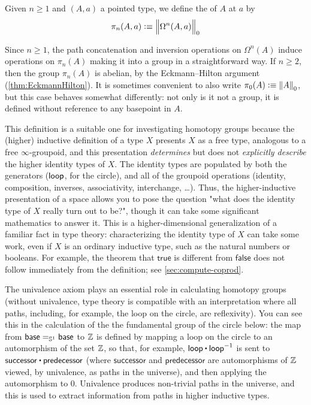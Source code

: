 \begin{defn}\label{def-of-homotopy-groups}
  Given $n\ge 1$ and $(A,a)$ a pointed type, we define the  of $A$
  at $a$ by
  \[\pi_n(A,a)\defeq \Trunc0{\Omega^n(A,a)}\]
\end{defn}

\noindent
Since $n\ge 1$, the path concatenation and inversion operations on
$\Omega^n(A)$ induce operations on $\pi_n(A)$ making it into a group in
a straightforward way.  If $n\ge 2$, then the group $\pi_n(A)$ is
abelian, by the Eckmann--Hilton argument (\autoref{thm:EckmannHilton}).
It is sometimes convenient to also write $\pi_0(A) \defeq \trunc0 A$,
but this case behaves somewhat differently: not only is it not a group,
it is defined without reference to any basepoint in $A$.

This definition is a suitable one for investigating homotopy groups
because the (higher) inductive definition of a type $X$ presents $X$ as
a free type, analogous to a free $\infty$-groupoid, and this
presentation \emph{determines} but does not \emph{explicitly describe}
the higher identity types of $X$.  The identity types are populated by
both the generators ($\lloop$, for the circle), and all of the groupoid
operations (identity, composition, inverses, associativity, interchange,
\ldots).  Thus, the higher-inductive presentation of a space allows you
to pose the question "what does the identity type of $X$ really turn out
to be?", though it can take some significant mathematics to answer it.
This is a higher-dimensional generalization of a familiar fact in type
theory: characterizing the identity type of $X$ can take some work,
even if $X$ is an ordinary inductive type, such as the natural numbers
or booleans.  For example, the theorem that $\mathsf{true}$ is different
from $\mathsf{false}$ does not follow immediately from the definition;
see \autoref{sec:compute-coprod}.

The univalence axiom plays an essential role in calculating homotopy
groups (without univalence, type theory is compatible with an
interpretation where all paths, including, for example, the loop on the
circle, are reflexivity).  You can see this in the calculation of the
the fundamental group of the circle below: the map from $\id[\Sn ^1]
\base \base$ to $\Z$ is defined by mapping a loop on the circle to an
automorphism of the set $\Z$, so that, for example, $\lloop \ct \opp
\lloop$ is sent to $\mathsf{successor} \ct \mathsf{predecessor}$ (where
$\mathsf{successor}$ and $\mathsf{predecessor}$ are automorphisms of
$\Z$ viewed, by univalence, as paths in the universe), and then applying
the automorphism to 0. Univalence produces non-trivial paths in the
universe, and this is used to extract information from paths in higher
inductive types.

